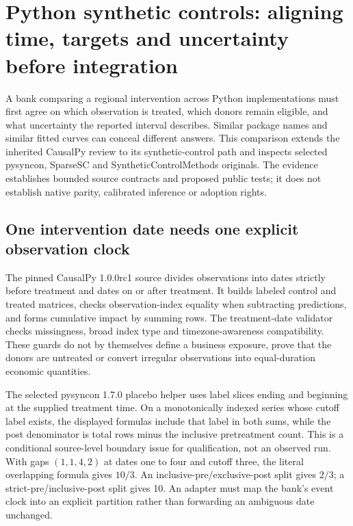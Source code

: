 \section{Python synthetic controls: aligning time, targets and uncertainty before integration}
\label{sec:exec25-synthetic-python-coverage}

A bank comparing a regional intervention across Python implementations must
first agree on which observation is treated, which donors remain eligible,
and what uncertainty the reported interval describes. Similar package names
and similar fitted curves can conceal different answers. This comparison
extends the inherited CausalPy review to its synthetic-control path and
inspects selected pysyncon, SparseSC and SyntheticControlMethods originals.
The evidence establishes bounded source contracts and proposed public tests;
it does not establish native parity, calibrated inference or adoption rights.
\citep{exec25_synthpy_choice}

\subsection{One intervention date needs one explicit observation clock}
The pinned CausalPy 1.0.0rc1 source divides observations into dates strictly
before treatment and dates on or after treatment. It builds labeled control
and treated matrices, checks observation-index equality when subtracting
predictions, and forms cumulative impact by summing rows. The treatment-date
validator checks missingness, broad index type and timezone-awareness
compatibility. These guards do not by themselves define a business exposure,
prove that the donors are untreated or convert irregular observations into
equal-duration economic quantities.\citep{exec25_synthpy_causalpy}

The selected pysyncon 1.7.0 placebo helper uses label slices ending and
beginning at the supplied treatment time. On a monotonically indexed series
whose cutoff label exists, the displayed formulas include that label in both
sums, while the post denominator is total rows minus the inclusive
pretreatment count. This is a conditional source-level boundary issue for
qualification, not an observed run. With gaps $(1,1,4,2)$ at dates one to
four and cutoff three, the literal overlapping formula gives $10/3$.
An inclusive-pre/exclusive-post split gives $2/3$; a strict-pre/inclusive-post
split gives 10. An adapter must map the bank's event clock into an explicit
partition rather than forwarding an ambiguous date unchanged.
\citep{exec25_synthpy_pysyncon,exec25_synthpy_choice}

